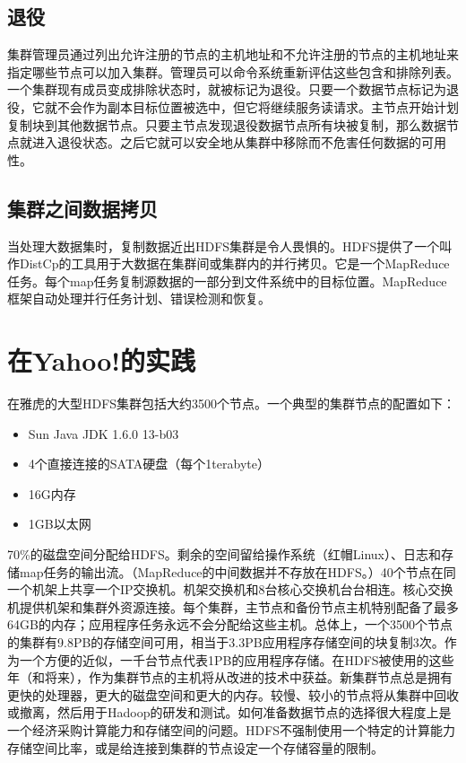 \subsection{退役}
集群管理员通过列出允许注册的节点的主机地址和不允许注册的节点的主机地址来指定哪些节点可以加入集群。管理员可以命令系统重新评估这些包含和排除列表。一个集群现有成员变成排除状态时，就被标记为退役。只要一个数据节点标记为退役，它就不会作为副本目标位置被选中，但它将继续服务读请求。主节点开始计划复制块到其他数据节点。只要主节点发现退役数据节点所有块被复制，那么数据节点就进入退役状态。之后它就可以安全地从集群中移除而不危害任何数据的可用性。

\subsection{集群之间数据拷贝}

当处理大数据集时，复制数据近出HDFS集群是令人畏惧的。HDFS提供了一个叫作DistCp的工具用于大数据在集群间或集群内的并行拷贝。它是一个MapReduce任务。每个map任务复制源数据的一部分到文件系统中的目标位置。MapReduce框架自动处理并行任务计划、错误检测和恢复。

\section{在Yahoo!的实践}

在雅虎的大型HDFS集群包括大约3500个节点。一个典型的集群节点的配置如下：
\begin{itemize}
,频率2.5ghz
5.1版
\item Sun Java JDK 1.6.0 13-b03
\item4个直接连接的SATA硬盘（每个1terabyte）
\item16G内存
\item1GB以太网
\end{itemize}

70\%的磁盘空间分配给HDFS。剩余的空间留给操作系统（红帽Linux）、日志和存储map任务的输出流。（MapReduce的中间数据并不存放在HDFS。）40个节点在同一个机架上共享一个IP交换机。机架交换机和8台核心交换机台台相连。核心交换机提供机架和集群外资源连接。每个集群，主节点和备份节点主机特别配备了最多64GB的内存；应用程序任务永远不会分配给这些主机。总体上，一个3500个节点的集群有9.8PB的存储空间可用，相当于3.3PB应用程序存储空间的块复制3次。作为一个方便的近似，一千台节点代表1PB的应用程序存储。在HDFS被使用的这些年（和将来），作为集群节点的主机将从改进的技术中获益。新集群节点总是拥有更快的处理器，更大的磁盘空间和更大的内存。较慢、较小的节点将从集群中回收或撤离，然后用于Hadoop的研发和测试。如何准备数据节点的选择很大程度上是一个经济采购计算能力和存储空间的问题。HDFS不强制使用一个特定的计算能力存储空间比率，或是给连接到集群的节点设定一个存储容量的限制。


